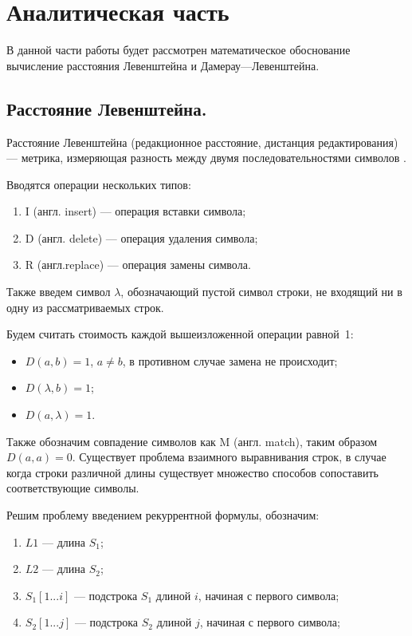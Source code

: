 \chapter{Аналитическая часть}
В данной части работы будет рассмотрен математическое обоснование
вычисление расстояния Левенштейна и Дамерау---Левенштейна.

\section{Расстояние Левенштейна.}


Расстояние Левенштейна (редакционное расстояние, дистанция редактирования) --- метрика, измеряющая разность между двумя последовательностями символов \cite{levenshtein}.

Вводятся операции нескольких типов:
\begin{enumerate}
	\item I (англ. insert) --- операция вставки символа;
	\item D (англ. delete) --- операция удаления символа;
	\item R (англ.replace) --- операция замены символа.
\end{enumerate}
Также введем символ $\lambda$, обозначающий пустой символ строки, не входящий ни в одну из рассматриваемых строк.

Будем считать стоимость каждой вышеизложенной операции равной~1:
\begin{itemize}[label=---]
	\item $D(a, b) = 1$, $a \neq b$, в противном случае замена не происходит;
	\item $D(\lambda, b) = 1$;
	\item $D(a, \lambda) = 1$.
\end{itemize}


Также обозначим совпадение символов как M (англ. match), таким образом $D(a,a) = 0$.
Существует  проблема взаимного выравнивания строк, в случае когда строки различной длины существует множество способов сопоставить соответствующие символы.

Решим проблему введением рекуррентной формулы, обозначим:
\begin{enumerate}
	\item $L1$ --- длина $S_{1}$;
	\item $L2$ --- длина $S_{2}$;
	\item $S_{1}[1...i]$ --- подстрока $S_{1}$ длиной $i$, начиная с первого символа;
	\item $S_{2}[1...j]$ --- подстрока $S_{2}$ длиной $j$, начиная с первого символа;
\end{enumerate}



